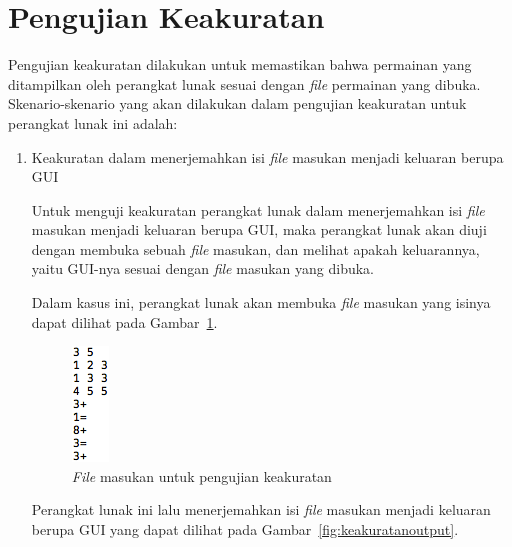 \section{Pengujian Keakuratan}
\label{sec:pengujiankeakuratan}

Pengujian keakuratan dilakukan untuk memastikan bahwa permainan yang ditampilkan oleh perangkat lunak sesuai dengan \textit{file} permainan yang dibuka. Skenario-skenario yang akan dilakukan dalam pengujian keakuratan untuk perangkat lunak ini adalah:

\begin{enumerate}

\item Keakuratan dalam menerjemahkan isi \textit{file} masukan menjadi keluaran berupa GUI

Untuk menguji keakuratan perangkat lunak dalam menerjemahkan isi \textit{file} masukan menjadi keluaran berupa GUI, maka perangkat lunak akan diuji dengan membuka sebuah \textit{file} masukan, dan melihat apakah keluarannya, yaitu GUI-nya sesuai dengan \textit{file} masukan yang dibuka. 

Dalam kasus ini, perangkat lunak akan membuka \textit{file} masukan yang isinya dapat dilihat pada Gambar~\ref{fig:keakurataninput}.

\begin{figure}
\centering
\captionsetup{justification=centering}
\includegraphics[scale=1]{Gambar/ImplementasiPengujian/Input.png}
\caption[\textit{File} masukan untuk pengujian keakuratan]{\textit{File} masukan untuk pengujian keakuratan}
\label{fig:keakurataninput}
\end{figure}

Perangkat lunak ini lalu menerjemahkan isi \textit{file} masukan menjadi keluaran berupa GUI yang dapat dilihat pada Gambar~\ref{fig:keakuratanoutput}.


\end{enumerate}
